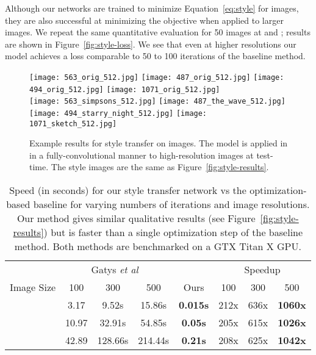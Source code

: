 \documentclass[runningheads]{llncs}
\newcommand{\etal}{\textit{et al}}
\begin{document}
Although our networks are trained to minimize Equation~\ref{eq:style} for  images,
they are also successful at minimizing the objective when applied to larger images. We repeat the
same quantitative evaluation for 50 images at  and ; results are shown
in Figure~\ref{fig:style-loss}. We see that even at higher resolutions our model achieves a loss
comparable to 50 to 100 iterations of the baseline method.

\begin{figure}[t]
  \centering
  \texttt{[image: 563\_orig\_512.jpg]} 
  \texttt{[image: 487\_orig\_512.jpg]}
  \texttt{[image: 494\_orig\_512.jpg]}
  \texttt{[image: 1071\_orig\_512.jpg]} \\
  \texttt{[image: 563\_simpsons\_512.jpg]}
  \texttt{[image: 487\_the\_wave\_512.jpg]}
  \texttt{[image: 494\_starry\_night\_512.jpg]}
  \texttt{[image: 1071\_sketch\_512.jpg]}
  \vspace{-3mm}
  \caption{Example results for style transfer on  images. The model
    is applied in in a fully-convolutional manner to high-resolution images at test-time.
    The style images are the same as Figure~\ref{fig:style-results}.
  }
  \label{fig:style-results-512}
\end{figure}

\begin{table}[t]
  \centering
  \begin{tabular}{c||ccc|c||ccc}
    & \multicolumn{3}{c|}{Gatys \etal~\cite{gatys2015neural}} & 
    & \multicolumn{3}{c}{Speedup}\\
    Image Size & 100 & 300 & 500 \hspace{1mm} &
    \hspace{1mm} Ours \hspace{1mm} & \hspace{1mm} 100 & 300 & 500 \\
    \hline
     & 3.17 & 9.52s & 15.86s &
    \textbf{0.015s} & 212x & 636x & \textbf{1060x} \\
     & 10.97 & 32.91s & 54.85s &
    \textbf{0.05s} & 205x & 615x & \textbf{1026x} \\
     & 42.89 & 128.66s & 214.44s &
    \textbf{0.21s} & 208x & 625x & \textbf{1042x}\\
  \end{tabular}
  \vspace{1mm}
  \caption{Speed (in seconds) for our style transfer network vs the optimization-based
    baseline for varying numbers of iterations and image resolutions.
    Our method gives similar qualitative results (see Figure~\ref{fig:style-results})
    but is faster than a single optimization step of the baseline method. Both methods
    are benchmarked on a GTX Titan X GPU.
  }
  \label{tab:style-speed}
  \vspace{-8mm}
\end{table}
\end{document}
